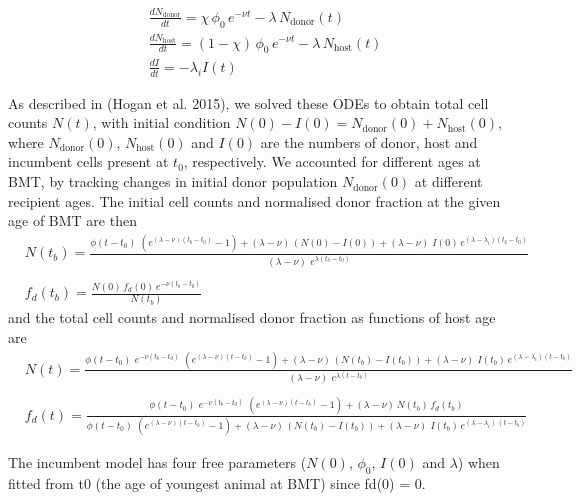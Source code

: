 \documentclass[11.5pt]{article}
\newcommand{\be}{\begin{equation}}
\newcommand{\ee}{\end{equation}}
\begin{document}
\be
\begin{aligned}
 &\frac{dN_{\text{donor}}}{dt} = \chi \, \phi_0 \, e^{-\nu t} - \lambda \, N_{\text{donor}}(t) \\
 &\frac{dN_{\text{host}}}{dt} = (1-\chi) \, \phi_0 \, e^{-\nu t} - \lambda \, N_{\text{host}}(t)\\
 &\frac{dI}{dt}   = -\lambda_i I(t) 
\end{aligned}
\ee
 
As described in (Hogan et al. 2015), we solved these ODEs  to obtain total cell counts $N(t)$, with initial condition $N(0) - I(0) = N_{\text{donor}}(0) + N_{\text{host}}(0)$, where $N_{\text{donor}}(0)$, $N_{\text{host}}(0)$ and $I(0)$ are the numbers of donor, host and incumbent cells present at $t_0$, respectively. We accounted for different ages at BMT,  by tracking changes in initial donor population $N_{\text{donor}}(0)$ at different recipient ages. The initial cell counts and normalised donor fraction at the given age of BMT are then
\be
\begin{aligned}
&N(t_b) = \frac{\phi(t-t_0) \, \, (e^{(\lambda - \nu) (t_b-t_0)} - 1) + (\lambda-\nu) \, (N(0)-I(0)) + (\lambda-\nu) \, \, I(0) \, e^{(\lambda - \lambda_i) (t_b-t_0)}} {(\lambda-\nu) \,\, e^{\lambda (t_b-t_0)}} \\
\\
&f_d(t_b) = \frac{N(0) \,f_d(0) \, e^{-\nu (t_b-t_0)} }{N(t_b)}
\end{aligned}
\ee
and the total cell counts and normalised donor fraction as functions of host age are
\be
\begin{aligned}
&N(t) = \frac{\phi(t-t_0) \, \, e^{-\nu(t_b-t_0)} \, \,  (e^{(\lambda - \nu) (t-t_b)} - 1) + (\lambda-\nu) \, (N(t_b)-I(t_b)) + (\lambda-\nu) \, \, I(t_b) \, e^{(\lambda - \lambda_i) (t-t_b)}} {(\lambda-\nu) \,\, e^{\lambda (t-t_b)}}\\
\\
&f_d(t) = \frac{\phi(t-t_0) \, \, e^{-\nu(t_b-t_0)} \, \, (e^{(\lambda - \nu) (t-t_b)} - 1) + (\lambda-\nu) \,  N(t_b) \, f_d(t_b)}{ \phi(t-t_0) \, \, (e^{(\lambda - \nu) (t-t_b)} - 1) + (\lambda-\nu) \, (N(t_b)-I(t_b)) + (\lambda-\nu) \,\, I(t_b) \, e^{(\lambda -\lambda_i) \, (t-t_b)}}
\end{aligned}
\ee

The incumbent model has four free parameters ($N(0)$, $\phi_0$, $I(0)$ and $\lambda$) when fitted from t0 (the age of youngest animal at BMT) since fd(0) = 0.
 
 
\clearpage
\end{document}
